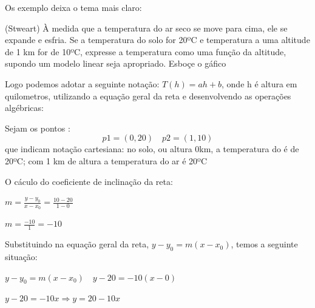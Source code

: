\begin{multicols*}{2}
    Os exemplo deixa o tema mais claro:


    (Stweart) À medida que a temperatura do ar seco se move para cima, ele se expande e 					esfria. Se a temperatura do solo for 20ºC e temperatura a uma altitude de 1 km for de 10ºC, 			expresse a temperatura como uma função da altitude, supondo um modelo linear seja apropriado. 			Esboçe o gáfico

    Logo podemos adotar a seguinte notação: $T(h) = ah +b$, onde h é altura em quilometros, 				utilizando a equação geral da reta e desenvolvendo as operações algébricas:

    Sejam os pontos :
    \begin{equation}
        p1 = (0,20) \quad
        p2 = (1,10)
    \end{equation}
    que indicam notação cartesiana: no solo, ou altura 0km, a temperatura do é de 20ºC; com 1 km de 		altura a temperatura do ar é 20ºC

    O cáculo do coeficiente de inclinação da reta:

    $m = \frac{y-y_0}{x - x_0} = \frac{ 10 - 20}{ 1 - 0}$

    $m = \frac{-10}{1} = -10$

    Substituindo na equação geral da reta, $y - y_0 = m(x-x_0)$, temos a seguinte situação:

    $y - y_0 = m(x-x_0) \quad y - 20 = -10(x-0)$

    $y - 20 = -10x  \Rightarrow y = 20 -10x$


\end{multicols*}
